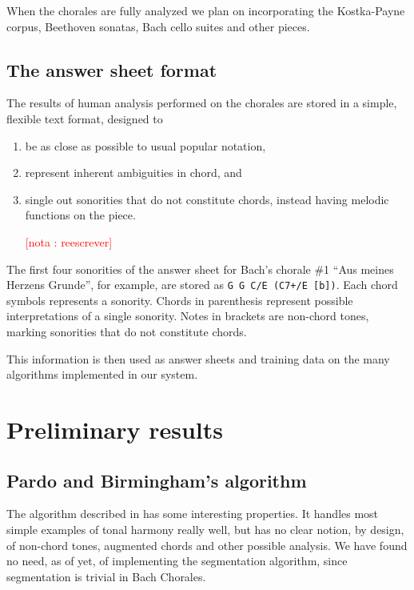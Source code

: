 \documentclass{article}
\newcounter{notacounter}
\newcommand{\nota}[1]{
  \addtocounter{notacounter}{1}
  \textcolor{red}{[nota \arabic{notacounter}: #1]}
}
\begin{document}
When the chorales are fully analyzed we plan on incorporating the
Kostka-Payne \cite{kostka.ea:tonal} corpus, Beethoven sonatas, Bach
cello suites and other pieces.

\subsection{The answer sheet format}
\label{sec:formato-dos-acordes}

The results of human analysis performed on the chorales are stored in
a simple, flexible text format, designed to

\begin{enumerate}
\item be as close as possible to usual popular notation,
\item represent inherent ambiguities in chord, and
\item single out sonorities that do not constitute chords, instead
  having melodic functions on the piece. \nota{reescrever}
\end{enumerate}

The first four sonorities of the answer sheet for Bach's chorale \#1
``Aus meines Herzens Grunde'', for example, are stored as \texttt{G G
  C/E (C7+/E [b])}. Each chord symbols represents a sonority. Chords
in parenthesis represent possible interpretations of a single
sonority. Notes in brackets are non-chord tones, marking sonorities
that do not constitute chords.

This information is then used as answer sheets and training data on the
many algorithms implemented in our system.

\section{Preliminary results}
\label{sec:analysis-results}

\subsection{Pardo and Birmingham's algorithm}
\label{sec:pardo-birmingham}

The algorithm described in \cite{pardo.ea:automated} has some
interesting properties. It handles most simple examples of tonal
harmony really well, but has no clear notion, by design, of non-chord
tones, augmented chords and other possible analysis. We
have found no need, as of yet, of implementing the segmentation
algorithm, since segmentation is trivial in Bach Chorales.
\end{document}
